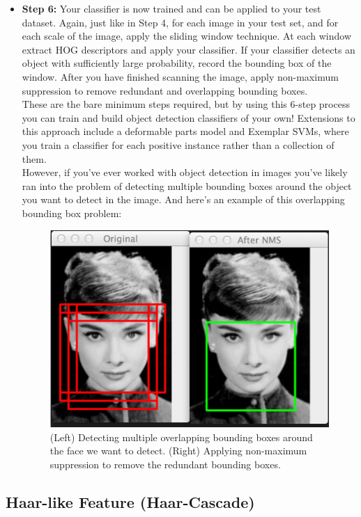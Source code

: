 \begin{itemize}
            \item \textbf{Step 6:} Your classifier is now trained and can be applied to your test dataset. Again, just like in Step 4, for each image in your test set, and for each scale of the image, apply the sliding window technique. 
                At each window extract HOG descriptors and apply your classifier. If your classifier detects an object with sufficiently large probability, record the bounding box of the window. After you have finished scanning the image, 
                apply non-maximum suppression to remove redundant and overlapping bounding boxes. \\ 
                \vspace{2mm}
                These are the bare minimum steps required, but by using this 6-step process you can train and build object detection classifiers of your own! Extensions to this approach include a deformable parts model and Exemplar SVMs, 
                where you train a classifier for each positive instance rather than a collection of them. \\ 
                \vspace{2mm}
                However, if you’ve ever worked with object detection in images you’ve likely ran into the problem of detecting multiple bounding boxes around the object you want to detect in the image. And here’s an example of this overlapping bounding box problem:
                \begin{figure}[H]
                    \centering
                    \includegraphics[width=0.6\linewidth]{img/multiple-overlapping.jpg}
                    \caption{(Left) Detecting multiple overlapping bounding boxes around the face we want to detect. (Right) Applying non-maximum suppression to remove the redundant bounding boxes.}
                \end{figure}
        \end{itemize}

    \subsection{Haar-like Feature (Haar-Cascade)}
